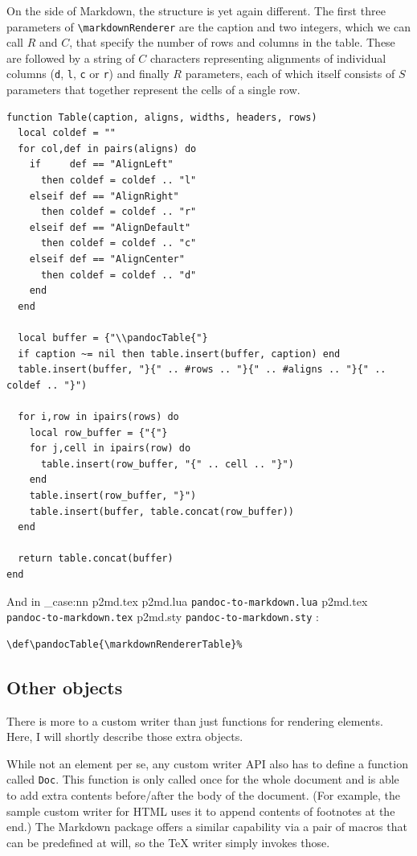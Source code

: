 \documentclass[
  digital,     %
  oneside,     %
  nosansbold,  %
  nocolorbold, %
  lof,         %
  nolot,       %
]{fithesis4}
\newcommand\macro[1]{\texttt{\textbackslash{}{#1}}}
\newcommand\renderer[1]{\macro{markdown\-Renderer\-{#1}}}
\newcommand\file[1]
  {
    \str_case:nn
      { #1 }
      {
        { p2md.lua } { \texttt{pandoc\hyp{}to\hyp{}markdown.lua} }
        { p2md.tex } { \texttt{pandoc\hyp{}to\hyp{}markdown.tex} }
        { p2md.sty } { \texttt{pandoc\hyp{}to\hyp{}markdown.sty} }
      }
  }
\begin{document}
On the side of Markdown, the structure is yet again different. The first three parameters of \renderer{Table} are the caption and two integers, which we can call $R$ and $C$, that specify the number of rows and columns in the table. These are followed by a string of $C$ characters representing alignments of individual columns (\texttt{d}, \texttt{l}, \texttt{c} or \texttt{r}) and finally $R$ parameters, each of which itself consists of $S$ parameters that together represent the cells of a single row.

\noindent
\lstset{language=[5.3]Lua}
\begin{lstlisting}
function Table(caption, aligns, widths, headers, rows)
  local coldef = ""
  for col,def in pairs(aligns) do
    if     def == "AlignLeft"
      then coldef = coldef .. "l"
    elseif def == "AlignRight"
      then coldef = coldef .. "r"
    elseif def == "AlignDefault"
      then coldef = coldef .. "c"
    elseif def == "AlignCenter"
      then coldef = coldef .. "d"
    end
  end

  local buffer = {"\\pandocTable{"}
  if caption ~= nil then table.insert(buffer, caption) end
  table.insert(buffer, "}{" .. #rows .. "}{" .. #aligns .. "}{" .. coldef .. "}")

  for i,row in ipairs(rows) do
    local row_buffer = {"{"}
    for j,cell in ipairs(row) do
      table.insert(row_buffer, "{" .. cell .. "}")
    end
    table.insert(row_buffer, "}")
    table.insert(buffer, table.concat(row_buffer))
  end

  return table.concat(buffer)
end
\end{lstlisting}

\noindent
And in \file{p2md.tex}:

\noindent
\lstset{language=[plain]TeX}
\begin{lstlisting}
\def\pandocTable{\markdownRendererTable}%
\end{lstlisting}

\subsection{Other objects}
There is more to a custom writer than just functions for rendering elements. Here, I will shortly describe those extra objects.

While not an element per se, any custom writer API also has to define a function called \texttt{Doc}. This function is only called once for the whole document and is able to add extra contents before/after the body of the document. (For example, the sample custom writer for HTML uses it to append contents of footnotes at the end.) The Markdown package offers a similar capability via a pair of macros that can be predefined at will, so the \TeX{} writer simply invokes those.
\end{document}
